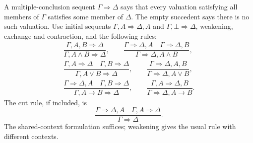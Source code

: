 A multiple-conclusion sequent $\Gamma\Rightarrow\Delta$ says that every
valuation satisfying all members of $\Gamma$ satisfies some member of
$\Delta$. The empty succedent says there is no such valuation. Use initial
sequents $\Gamma,A\Rightarrow\Delta,A$ and
$\Gamma,\bot\Rightarrow\Delta$, weakening, exchange and contraction,
and the following rules:
\[
\begin{gathered}
 \dfrac{\Gamma,A,B\Rightarrow\Delta}{\Gamma,A\wedge B\Rightarrow\Delta},\qquad
 \dfrac{\Gamma\Rightarrow\Delta,A\quad\Gamma\Rightarrow\Delta,B}
       {\Gamma\Rightarrow\Delta,A\wedge B},\\[5pt]
 \dfrac{\Gamma,A\Rightarrow\Delta\quad\Gamma,B\Rightarrow\Delta}
       {\Gamma,A\vee B\Rightarrow\Delta},\qquad
 \dfrac{\Gamma\Rightarrow\Delta,A,B}{\Gamma\Rightarrow\Delta,A\vee B},\\[5pt]
 \dfrac{\Gamma\Rightarrow\Delta,A\quad\Gamma,B\Rightarrow\Delta}
       {\Gamma,A\to B\Rightarrow\Delta},\qquad
 \dfrac{\Gamma,A\Rightarrow\Delta,B}{\Gamma\Rightarrow\Delta,A\to B}.
\end{gathered}
\]
The cut rule, if included, is
\[
 \dfrac{\Gamma\Rightarrow\Delta,A\quad\Gamma,A\Rightarrow\Delta}
       {\Gamma\Rightarrow\Delta}.
\]
The shared-context formulation suffices; weakening gives the usual rule
with different contexts.


